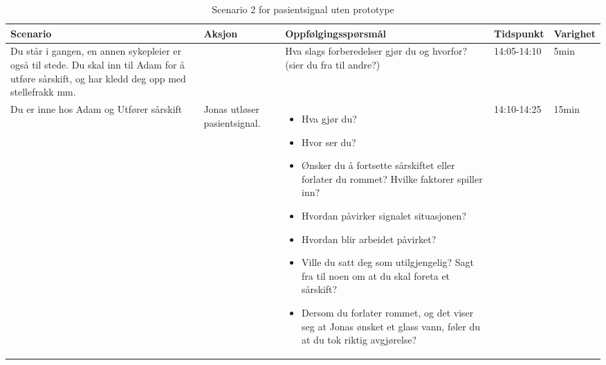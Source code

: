 \begin{table}[H]
\small
\caption{Scenario 2 for pasientsignal uten prototype}
\begin{tabular}{p{3cm}|p{2cm}|p{4cm}|l|l}
\hline
\textbf{Scenario} & \textbf{Aksjon} & \textbf{Oppfølgingsspørsmål} & \textbf{Tidspunkt} & \textbf{Varighet}\\
\hline
Du står i gangen, en annen sykepleier er også til stede. Du skal inn til Adam for å utføre sårskift, og har kledd deg opp med stellefrakk  mm. & & Hva slags forberedelser gjør du og hvorfor? (sier du fra til andre?)
& 14:05-14:10 & 5min\\
\hline
Du er inne hos Adam og Utfører sårskift & Jonas utløser pasientsignal. & 
\begin{itemize}
\item Hva gjør du?
\item Hvor ser du?
\item Ønsker du å fortsette sårskiftet eller forlater du rommet? Hvilke faktorer spiller inn?
\item Hvordan påvirker signalet situasjonen?
\item Hvordan blir arbeidet påvirket?
\item Ville du satt deg som utilgjengelig? Sagt fra til noen om at du skal foreta et sårskift?
\item Dersom du forlater rommet, og det viser seg at Jonas ønsket et glass vann, føler du at du tok riktig avgjørelse?
\end{itemize}
 & 14:10-14:25 & 15min\\
\end{tabular}
\label{Steg3.2}
\end{table}

\pagebreak

